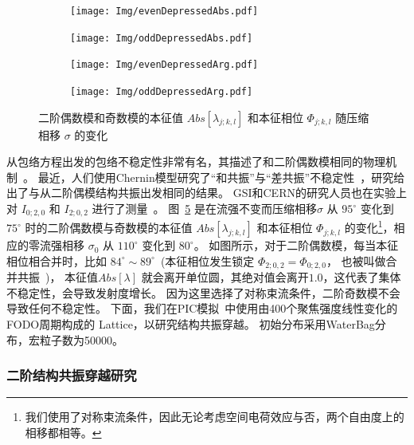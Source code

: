 \begin{figure}
    \centering
    \begin{subfigure}[b]{0.48\textwidth}
        \texttt{[image: Img/evenDepressedAbs.pdf]}
        \caption{}
        \label{sfig:stopbandEvenAbs}
    \end{subfigure}
    \begin{subfigure}[b]{0.48\textwidth}
        \texttt{[image: Img/oddDepressedAbs.pdf]}
        \caption{}
        \label{sfig:stopbandOddAbs}
    \end{subfigure}

    \begin{subfigure}[b]{0.48\textwidth}
        \texttt{[image: Img/evenDepressedArg.pdf]}
        \caption{}
        \label{sfig:stopbandEvenArg}
    \end{subfigure}
    \begin{subfigure}[b]{0.48\textwidth}
        \texttt{[image: Img/oddDepressedArg.pdf]}
        \caption{}
        \label{sfig:stopbandOddArg}
    \end{subfigure}
    \caption{二阶偶数模和奇数模的本征值 $Abs[\lambda_{j;k,l}]$ 和本征相位 $\Phi_{j;k,l}$ 随压缩相移 $\sigma$ 的变化}
    \label{fig:stopband}
\end{figure}

从包络方程出发的包络不稳定性非常有名，其描述了和二阶偶数模相同的物理机制~\cite{11,12,18}。
最近，人们使用Chernin模型研究了“和共振”与“差共振”不稳定性~\cite{21,22}，研究给出了与从二阶偶模结构共振出发相同的结果。
GSI和CERN的研究人员也在实验上对 $I_{0;2,0}$ 和 $I_{2;0,2}$ 进行了测量~\cite{singh2014observations,cernAdrian}。
图~\ref{fig:stopband} 是在流强不变而压缩相移$\sigma$ 从 $95^{\circ}$ 变化到 $75^{\circ}$ 时的二阶偶数模与奇数模的本征值 $Abs[\lambda_{j;k,l}]$ 和本征相位 $\Phi_{j;k,l}$ 的变化\footnote{我们使用了对称束流条件，因此无论考虑空间电荷效应与否，两个自由度上的相移都相等。}，相应的零流强相移 $\sigma_0$ 从 $110^{\circ}$ 变化到 $80^{\circ}$。
如图所示，对于二阶偶数模，每当本征相位相合并时，比如 $84^\circ \sim 89^\circ$~(本征相位发生锁定 $\Phi_{2;0,2}=\Phi_{0;2,0}$， 也被叫做合并共振~\cite{12})， 本征值$Abs[\lambda]$ 就会离开单位圆，其绝对值会离开$1.0$，这代表了集体不稳定性，会导致发射度增长。
因为这里选择了对称束流条件，二阶奇数模不会导致任何不稳定性。
下面，我们在PIC模拟~\cite{23,24}中使用由400个聚焦强度线性变化的FODO周期构成的 Lattice，以研究结构共振穿越。
初始分布采用WaterBag分布，宏粒子数为50000。


\subsubsection{二阶结构共振穿越研究}


